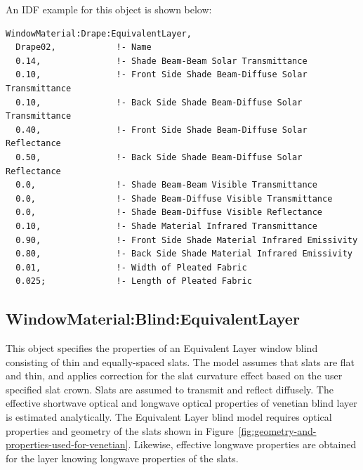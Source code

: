 An IDF example for this object is shown below:

\begin{lstlisting}
WindowMaterial:Drape:EquivalentLayer,
  Drape02,            !- Name
  0.14,               !- Shade Beam-Beam Solar Transmittance
  0.10,               !- Front Side Shade Beam-Diffuse Solar Transmittance
  0.10,               !- Back Side Shade Beam-Diffuse Solar Transmittance
  0.40,               !- Front Side Shade Beam-Diffuse Solar Reflectance
  0.50,               !- Back Side Shade Beam-Diffuse Solar Reflectance
  0.0,                !- Shade Beam-Beam Visible Transmittance
  0.0,                !- Shade Beam-Diffuse Visible Transmittance
  0.0,                !- Shade Beam-Diffuse Visible Reflectance
  0.10,               !- Shade Material Infrared Transmittance
  0.90,               !- Front Side Shade Material Infrared Emissivity
  0.80,               !- Back Side Shade Material Infrared Emissivity
  0.01,               !- Width of Pleated Fabric
  0.025;              !- Length of Pleated Fabric
\end{lstlisting}

\subsection{WindowMaterial:Blind:EquivalentLayer}\label{windowmaterialblindequivalentlayer}

This object specifies the properties of an Equivalent Layer window blind consisting of thin and equally-spaced slats. The model assumes that slats are flat and thin, and applies correction for the slat curvature effect based on the user specified slat crown. Slats are assumed to transmit and reflect diffusely. The effective shortwave optical and longwave optical properties of venetian blind layer is estimated analytically. The Equivalent Layer blind model requires optical properties and geometry of the slats shown in Figure~\ref{fig:geometry-and-properties-used-for-venetian}. Likewise, effective longwave properties are obtained for the layer knowing longwave properties of the slats.

